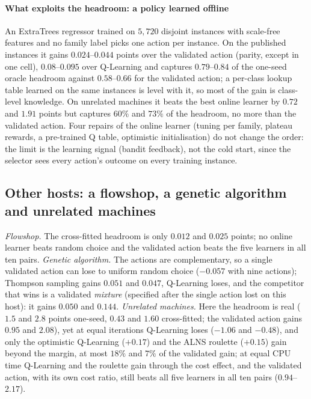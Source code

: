 \paragraph{What exploits the headroom: a policy learned offline} An ExtraTrees regressor trained on $5{,}720$ disjoint instances with scale-free features and no family label picks one action per instance. On the published instances it gains $0.024$--$0.044$ points over the validated action (parity, except in one cell), $0.08$--$0.095$ over Q-Learning and captures $0.79$--$0.84$ of the one-seed oracle headroom against $0.58$--$0.66$ for the validated action; a per-class lookup table learned on the same instances is level with it, so most of the gain is class-level knowledge. On unrelated machines it beats the best online learner by $0.72$ and $1.91$ points but captures $60\%$ and $73\%$ of the headroom, no more than the validated action. Four repairs of the online learner (tuning per family, plateau rewards, a pre-trained Q table, optimistic initialisation) do not change the order: the limit is the learning signal (bandit feedback), not the cold start, since the selector sees every action's outcome on every training instance.

\subsection{Other hosts: a flowshop, a genetic algorithm and unrelated machines}
\label{sec:hosts}
\emph{Flowshop.} The cross-fitted headroom is only $0.012$ and $0.025$ points; no online learner beats random choice and the validated action beats the five learners in all ten pairs. \emph{Genetic algorithm.} The actions are complementary, so a single validated action can lose to uniform random choice ($-0.057$ with nine actions); Thompson sampling gains $0.051$ and $0.047$, Q-Learning loses, and the competitor that wins is a validated \emph{mixture} (specified after the single action lost on this host): it gains $0.050$ and $0.144$. \emph{Unrelated machines.} Here the headroom is real ($1.5$ and $2.8$ points one-seed, $0.43$ and $1.60$ cross-fitted; the validated action gains $0.95$ and $2.08$), yet at equal iterations Q-Learning loses ($-1.06$ and $-0.48$), and only the optimistic Q-Learning ($+0.17$) and the ALNS roulette ($+0.15$) gain beyond the margin, at most $18\%$ and $7\%$ of the validated gain; at equal CPU time Q-Learning and the roulette gain through the cost effect, and the validated action, with its own cost ratio, still beats all five learners in all ten pairs ($0.94$--$2.17$).

